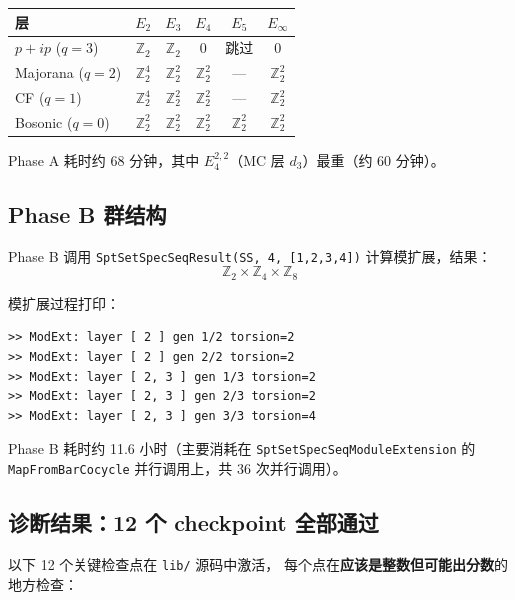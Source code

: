\documentclass[a4paper,fontset=ubuntu,12pt]{ctexart}
\begin{document}
\begin{center}
\begin{tabular}{l|cccc|c}
\hline
层 & $E_2$ & $E_3$ & $E_4$ & $E_5$ & $E_\infty$ \\
\hline
$p{+}ip$ ($q=3$) & $\mathbb{Z}_2$ & $\mathbb{Z}_2$ & $0$ & 跳过 & $0$ \\
Majorana ($q=2$) & $\mathbb{Z}_2^4$ & $\mathbb{Z}_2^2$ & $\mathbb{Z}_2^2$ & --- & $\mathbb{Z}_2^2$ \\
CF ($q=1$) & $\mathbb{Z}_2^4$ & $\mathbb{Z}_2^2$ & $\mathbb{Z}_2^2$ & --- & $\mathbb{Z}_2^2$ \\
Bosonic ($q=0$) & $\mathbb{Z}_2^2$ & $\mathbb{Z}_2^2$ & $\mathbb{Z}_2^2$ & $\mathbb{Z}_2^2$ & $\mathbb{Z}_2^2$ \\
\hline
\end{tabular}
\end{center}

Phase A 耗时约 68 分钟，其中 $E^{2,2}_4$（MC 层 $d_3$）最重（约 60 分钟）。

\subsection{Phase B 群结构}

Phase B 调用 \texttt{SptSetSpecSeqResult(SS, 4, [1,2,3,4])} 计算模扩展，结果：
\[
\boxed{\mathbb{Z}_2 \times \mathbb{Z}_4 \times \mathbb{Z}_8}
\]

模扩展过程打印：
\begin{verbatim}
>> ModExt: layer [ 2 ] gen 1/2 torsion=2
>> ModExt: layer [ 2 ] gen 2/2 torsion=2
>> ModExt: layer [ 2, 3 ] gen 1/3 torsion=2
>> ModExt: layer [ 2, 3 ] gen 2/3 torsion=2
>> ModExt: layer [ 2, 3 ] gen 3/3 torsion=4
\end{verbatim}

Phase B 耗时约 11.6 小时（主要消耗在 \texttt{SptSetSpecSeqModuleExtension} 的
\texttt{MapFromBarCocycle} 并行调用上，共 36 次并行调用）。

\subsection{诊断结果：12 个 checkpoint 全部通过}

以下 12 个关键检查点在 \texttt{lib/} 源码中激活，
每个点在\textbf{应该是整数但可能出分数}的地方检查：
\end{document}
